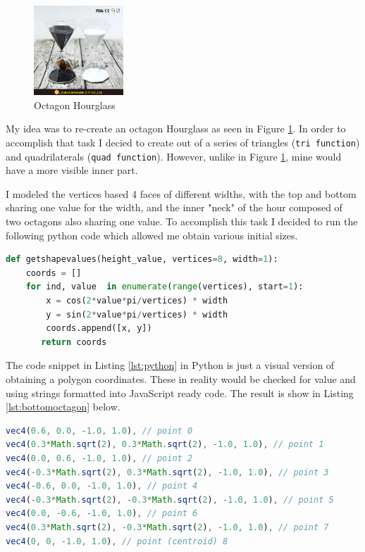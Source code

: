 \documentclass[12pt,a4paper]{article}
\begin{document}
\begin{figure}
\centering
\includegraphics[width=0.3\textwidth, angle = 0]{img/hourglass.png}
\caption{Octagon Hourglass \cite{hourglass}}
\label{img:hourglass}
\end{figure}
My idea was to re-create an octagon Hourglass as seen in Figure \ref{img:hourglass}. In order to accomplish that task I decied to create out of a series of triangles (\texttt{tri function{}}) and quadrilaterals (\texttt{quad function{}}). However, unlike in Figure \ref{img:hourglass}, mine would have a more visible inner part.  



I modeled the vertices based 4 faces of different widths, with the top and bottom sharing one value for the width, and the inner "neck" of the hour composed of two octagons also sharing one value. To accomplish this task I decided to run the following python code which allowed me obtain various initial sizes.
\clearpage
\begin{lstlisting}[caption={Getting values for the vertices},label={lst:python},language=python]
def getshapevalues(height_value, vertices=8, width=1):
    coords = []
    for ind, value  in enumerate(range(vertices), start=1):
        x = cos(2*value*pi/vertices) * width
        y = sin(2*value*pi/vertices) * width
        coords.append([x, y])
       return coords
\end{lstlisting}
The  code snippet in Listing \ref{lst:python} in Python is just a visual version of obtaining a polygon coordinates. These in reality would be checked for value and using strings formatted into JavaScript ready code. The result is show in Listing \ref{lst:bottomoctagon} below.

\begin{lstlisting}[caption={Bottom Octagon example vertex defintions},label={lst:bottomoctagon},language=JavaScript]
vec4(0.6, 0.0, -1.0, 1.0), // point 0
vec4(0.3*Math.sqrt(2), 0.3*Math.sqrt(2), -1.0, 1.0), // point 1
vec4(0.0, 0.6, -1.0, 1.0), // point 2
vec4(-0.3*Math.sqrt(2), 0.3*Math.sqrt(2), -1.0, 1.0), // point 3
vec4(-0.6, 0.0, -1.0, 1.0), // point 4
vec4(-0.3*Math.sqrt(2), -0.3*Math.sqrt(2), -1.0, 1.0), // point 5
vec4(0.0, -0.6, -1.0, 1.0), // point 6
vec4(0.3*Math.sqrt(2), -0.3*Math.sqrt(2), -1.0, 1.0), // point 7
vec4(0, 0, -1.0, 1.0), // point (centroid) 8
\end{lstlisting}
\end{document}
